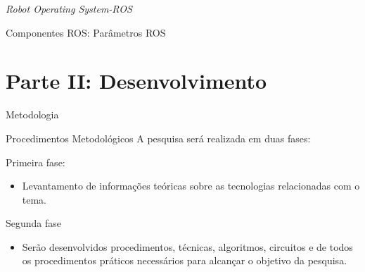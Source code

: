 \documentclass[10pt]{beamer}
\begin{document}
\begin{frame}{\textit{Robot Operating System-ROS}}
	\begin{alertblock}{Componentes ROS: Parâmetros ROS}
		\vspace{0.1cm}

	\end{alertblock}
\end{frame}



\section{Parte II: Desenvolvimento}




\begin{frame}{Metodologia}
    \begin{alertblock}{Procedimentos Metodológicos}
        A pesquisa será realizada em duas fases:
        \begin{block}{Primeira fase:}
            \begin{itemize}
                \item Levantamento de informações teóricas sobre as tecnologias relacionadas com o tema.
            \end{itemize}
        \end{block}
    
        \begin{block}{Segunda fase}
            \begin{itemize}
                \item Serão desenvolvidos procedimentos, técnicas, algoritmos, circuitos e de todos os procedimentos práticos necessários para alcançar o objetivo da pesquisa.
            \end{itemize}
        \end{block}
    \end{alertblock}

  
\end{frame}
\end{document}
